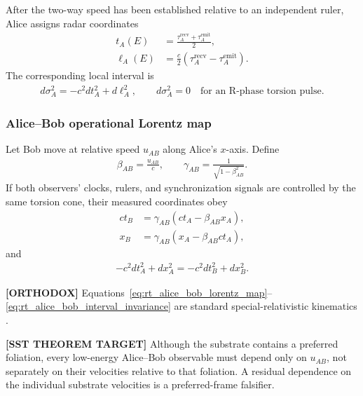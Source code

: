 After the two-way speed has been established relative to an independent ruler,
Alice assigns radar coordinates
\begin{align}
    t_A(E)
    &=
    \frac{\tau_A^{\mathrm{recv}}+\tau_A^{\mathrm{emit}}}{2},\\
    \ell_A(E)
    &=
    \frac{c}{2}
    \left(
        \tau_A^{\mathrm{recv}}-\tau_A^{\mathrm{emit}}
    \right).
    \label{eq:rt_vortex_atom_radar_coordinates}
\end{align}
The corresponding local interval is
\begin{align}
    d\sigma_A^2
    =
    -c^2dt_A^2+d\ell_A^2,
    \qquad
    d\sigma_A^2=0
    \quad\text{for an R-phase torsion pulse}.
    \label{eq:rt_vortex_atom_operational_interval}
\end{align}

\subsubsection{Alice--Bob operational Lorentz map}

Let Bob move at relative speed \(u_{AB}\) along Alice's \(x\)-axis. Define
\begin{align}
    \beta_{AB}=\frac{u_{AB}}{c},
    \qquad
    \gamma_{AB}=\frac{1}{\sqrt{1-\beta_{AB}^2}}.
\end{align}
If both observers' clocks, rulers, and synchronization signals are controlled by
the same torsion cone, their measured coordinates obey
\begin{align}
    ct_B
    &=
    \gamma_{AB}
    \left(ct_A-\beta_{AB}x_A\right),\\
    x_B
    &=
    \gamma_{AB}
    \left(x_A-\beta_{AB}ct_A\right),
    \label{eq:rt_alice_bob_lorentz_map}
\end{align}
and
\begin{align}
    -c^2dt_A^2+dx_A^2
    =
    -c^2dt_B^2+dx_B^2 .
    \label{eq:rt_alice_bob_interval_invariance}
\end{align}

\textbf{[ORTHODOX]} Equations~\eqref{eq:rt_alice_bob_lorentz_map}--
\eqref{eq:rt_alice_bob_interval_invariance} are standard special-relativistic
kinematics \cite{Einstein1905}.

\textbf{[SST THEOREM TARGET]} Although the substrate contains a preferred
foliation, every low-energy Alice--Bob observable must depend only on
\(u_{AB}\), not separately on their velocities relative to that foliation. A
residual dependence on the individual substrate velocities is a preferred-frame
falsifier.

